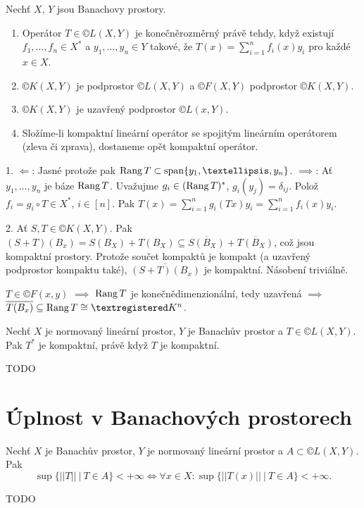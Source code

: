 \documentclass[12pt]{article}					%
\begin{document}
\begin{veta}
	Nechť $X$, $Y$ jsou Banachovy prostory.

	\begin{enumerate}
		\item Operátor $T \in ©L(X, Y)$ je konečněrozměrný právě tehdy, když existují $f_1, …, f_n \in X^*$ a $y_1, …, y_n \in Y$ takové, že $T(x) = \sum_{i = 1}^n f_i(x)y_i$ pro každé $x \in X$.
		\item $©K(X, Y)$ je podprostor $©L(X, Y)$ a $©F(X, Y)$ podprostor $©K(X, Y)$.
		\item $©K(X, Y)$ je uzavřený podprostor $©L(x, Y)$.
		\item Složíme-li kompaktní lineární operátor se spojitým lineárním operátorem (zleva či zprava), dostaneme opět kompaktní operátor.
	\end{enumerate}

	\begin{dukazin}
		1. $\Leftarrow$: Jasné protože pak $\Rang T \subset \spn\{y_1, …, y_n\}$. $\implies$: Ať $y_1, …, y_n$ je báze $\operatorname{Rang} T$. Uvažujme $g_i \in (\operatorname{Rang} T)^*$, $g_i(y_j) = \delta_{ij}$. Polož $f_i = g_i \circ T \in X^*$, $i \in [n]$. Pak $T(x) = \sum_{i=1}^n g_i(Tx)y_i = \sum_{i=1}^n f_i(x)y_i$.

		2. Ať $S, T \in ©K(X, Y)$. Pak $(S + T)(B_x) = S(B_X) + T(B_X) \subseteq \overline{S(B_X)} + \overline{T(B_X)}$, což jsou kompaktní prostory. Protože součet kompaktů je kompakt (a uzavřený podprostor kompaktu také), $\overline{(S + T)(B_x)}$ je kompaktní. Násobení triviálně.

		$T \in ©F(x, y)$ $\implies$ $\operatorname{Rang} T$ je konečnědimenzionální, tedy uzavřená $\implies$ $\overline{T(B_x)} \subseteq \Rang T \cong ®K^n$.
	\end{dukazin}
\end{veta}


\begin{veta}[J. P. Schauder, 1930]
	Nechť $X$ je normovaný lineární prostor, $Y$ je Banachův prostor a $T \in ©L(X, Y)$. Pak $T^*$ je kompaktní, právě když $T$ je kompaktní.

	\begin{dukazin}
		TODO
	\end{dukazin}
\end{veta}

\section{Úplnost v Banachových prostorech}
\begin{veta}
	Nechť $X$ je Banachův prostor, $Y$ je normovaný lineární prostor a $A \subset ©L(X, Y)$. Pak
	$$ \sup\{||T||\ |\ T \in A\} < +∞ \Leftrightarrow \forall x \in X: \sup\{||T(x)||\ |\ T \in A\} < +∞. $$

	\begin{dukazin}
		TODO
	\end{dukazin}
\end{veta}
\end{document}
